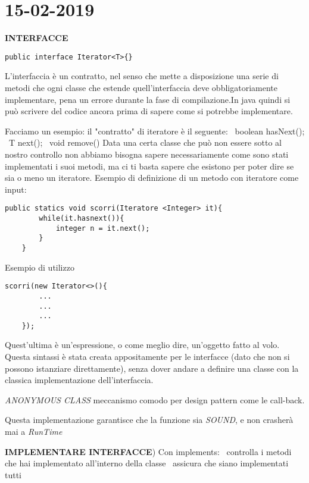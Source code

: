 
 
\newpage
\section{15-02-2019}
\textbf{INTERFACCE}\newline
\begin{lstlisting}[basicstyle=\small,]
	public interface Iterator<T>{}
\end{lstlisting}
L'interfaccia è un contratto, nel senso che mette a disposizione una serie di metodi che ogni classe che estende quell'interfaccia deve obbligatoriamente implementare, pena un errore durante la fase di compilazione.In java quindi si può scrivere del codice ancora prima di sapere come si potrebbe implementare.

\noindent Facciamo un esempio: il "contratto" di iteratore è il seguente: \newline
\textbullet\ boolean hasNext(); \newline
\textbullet\ T next(); \newline
\textbullet\ void remove()\newline
Data una certa classe che può non essere sotto al nostro controllo non abbiamo bisogna sapere necessariamente come sono stati implementati i suoi metodi, ma ci ti basta sapere che esistono per poter dire se sia o meno un iteratore. \newline
Esempio di definizione di un metodo con iteratore come input: 
\begin{lstlisting}[basicstyle=\small,]
	public statics void scorri(Iteratore <Integer> it){
		while(it.hasnext()){
			integer n = it.next();
		}
	}
\end{lstlisting}
Esempio di utilizzo 
\begin{lstlisting}[basicstyle=\small,]
	scorri(new Iterator<>(){
		...
		...
		...
	});
\end{lstlisting}
Quest'ultima è un'espressione, o come meglio dire, un'oggetto fatto al volo. Questa sintassi è stata creata appositamente per le interfacce (dato che non si possono istanziare direttamente), senza dover andare a definire una classe con la classica implementazione dell'interfaccia. 

\noindent \textit{ANONYMOUS CLASS} meccanismo comodo per design pattern come le call-back. 

\noindent Questa implementazione garantisce che la funzione sia \textit{SOUND}, e non crasherà mai a \textit{RunTime}

\noindent \textbf{IMPLEMENTARE INTERFACCE}) Con implements: \newline
\textbullet\ controlla i metodi che hai implementato all'interno della classe \newline
\textbullet\ assicura che siano implementati tutti 

